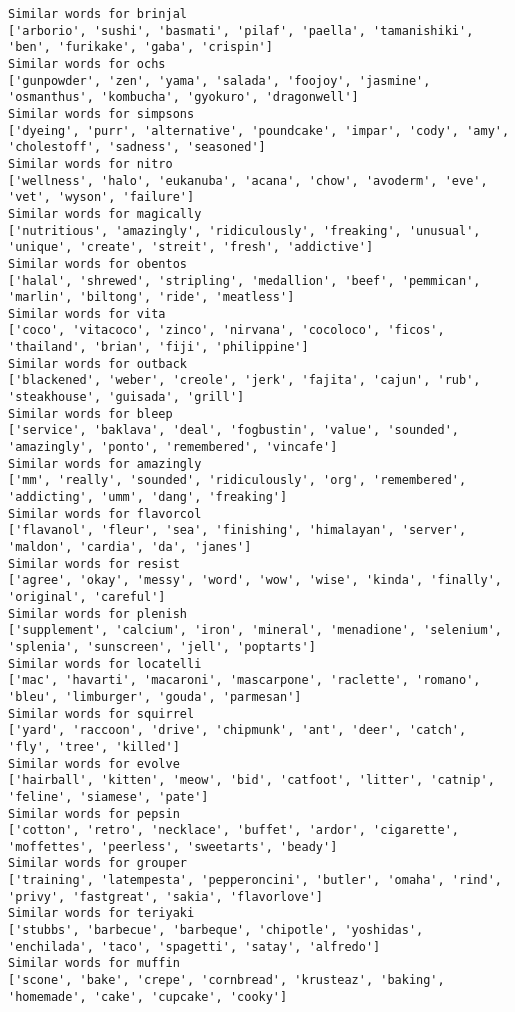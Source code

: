 \documentclass[11pt]{article}
\begin{document}
\begin{Verbatim}[commandchars=\\\{\}]
Similar words for brinjal
['arborio', 'sushi', 'basmati', 'pilaf', 'paella', 'tamanishiki', 'ben', 'furikake', 'gaba', 'crispin']
Similar words for ochs
['gunpowder', 'zen', 'yama', 'salada', 'foojoy', 'jasmine', 'osmanthus', 'kombucha', 'gyokuro', 'dragonwell']
Similar words for simpsons
['dyeing', 'purr', 'alternative', 'poundcake', 'impar', 'cody', 'amy', 'cholestoff', 'sadness', 'seasoned']
Similar words for nitro
['wellness', 'halo', 'eukanuba', 'acana', 'chow', 'avoderm', 'eve', 'vet', 'wyson', 'failure']
Similar words for magically
['nutritious', 'amazingly', 'ridiculously', 'freaking', 'unusual', 'unique', 'create', 'streit', 'fresh', 'addictive']
Similar words for obentos
['halal', 'shrewed', 'stripling', 'medallion', 'beef', 'pemmican', 'marlin', 'biltong', 'ride', 'meatless']
Similar words for vita
['coco', 'vitacoco', 'zinco', 'nirvana', 'cocoloco', 'ficos', 'thailand', 'brian', 'fiji', 'philippine']
Similar words for outback
['blackened', 'weber', 'creole', 'jerk', 'fajita', 'cajun', 'rub', 'steakhouse', 'guisada', 'grill']
Similar words for bleep
['service', 'baklava', 'deal', 'fogbustin', 'value', 'sounded', 'amazingly', 'ponto', 'remembered', 'vincafe']
Similar words for amazingly
['mm', 'really', 'sounded', 'ridiculously', 'org', 'remembered', 'addicting', 'umm', 'dang', 'freaking']
Similar words for flavorcol
['flavanol', 'fleur', 'sea', 'finishing', 'himalayan', 'server', 'maldon', 'cardia', 'da', 'janes']
Similar words for resist
['agree', 'okay', 'messy', 'word', 'wow', 'wise', 'kinda', 'finally', 'original', 'careful']
Similar words for plenish
['supplement', 'calcium', 'iron', 'mineral', 'menadione', 'selenium', 'splenia', 'sunscreen', 'jell', 'poptarts']
Similar words for locatelli
['mac', 'havarti', 'macaroni', 'mascarpone', 'raclette', 'romano', 'bleu', 'limburger', 'gouda', 'parmesan']
Similar words for squirrel
['yard', 'raccoon', 'drive', 'chipmunk', 'ant', 'deer', 'catch', 'fly', 'tree', 'killed']
Similar words for evolve
['hairball', 'kitten', 'meow', 'bid', 'catfoot', 'litter', 'catnip', 'feline', 'siamese', 'pate']
Similar words for pepsin
['cotton', 'retro', 'necklace', 'buffet', 'ardor', 'cigarette', 'moffettes', 'peerless', 'sweetarts', 'beady']
Similar words for grouper
['training', 'latempesta', 'pepperoncini', 'butler', 'omaha', 'rind', 'privy', 'fastgreat', 'sakia', 'flavorlove']
Similar words for teriyaki
['stubbs', 'barbecue', 'barbeque', 'chipotle', 'yoshidas', 'enchilada', 'taco', 'spagetti', 'satay', 'alfredo']
Similar words for muffin
['scone', 'bake', 'crepe', 'cornbread', 'krusteaz', 'baking', 'homemade', 'cake', 'cupcake', 'cooky']

\end{Verbatim}
\end{document}
